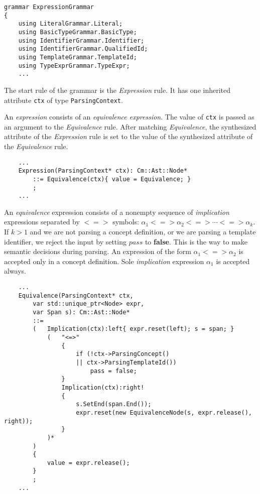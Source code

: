 \documentclass[a4paper,oneside,11pt]{book}
\theoremstyle{definition}
\begin{document}
\lstset{language=cmpg}
\begin{lstlisting}
grammar ExpressionGrammar
{
    using LiteralGrammar.Literal;
    using BasicTypeGrammar.BasicType;
    using IdentifierGrammar.Identifier;
    using IdentifierGrammar.QualifiedId;
    using TemplateGrammar.TemplateId;
    using TypeExprGrammar.TypeExpr;
    ...
\end{lstlisting}

The start rule of the grammar is the \emph{Expression} rule.
It has one inherited attribute \verb|ctx| of type \verb|ParsingContext|.

An \emph{expression} consists of an \emph{equivalence expression}.
The value of \verb|ctx| is passed as an argument to the \emph{Equivalence} rule.
After matching \emph{Equivalence}, the synthesized attribute of the \emph{Expression}
rule is set to the value of the synthesized attribute of the \emph{Equivalence} rule.

\lstset{language=cmpg}
\begin{lstlisting}
    ...
    Expression(ParsingContext* ctx): Cm::Ast::Node*
        ::= Equivalence(ctx){ value = Equivalence; }
        ;
    ...
\end{lstlisting}

An \emph{equivalence} expression consists of a nonempty sequence of \emph{implication}
expressions separated by $<=>$ symbols:
$\alpha_1 <=> \alpha_2 <=> \cdots <=> \alpha_k$.
If $k > 1$ and we are not parsing a concept definition, or we are parsing a template identifier,
we reject the input by setting $pass$ to \textbf{false}.
This is the way to make semantic decisions during parsing.
An expression of the form $\alpha_1 <=> \alpha_2$ is accepted only in a concept definition.
Sole \emph{implication} expression $\alpha_1$ is accepted always.

\lstset{language=cmpg}
\begin{lstlisting}
    ...
    Equivalence(ParsingContext* ctx,
        var std::unique_ptr<Node> expr,
        var Span s): Cm::Ast::Node*
        ::=
        (   Implication(ctx):left{ expr.reset(left); s = span; }
            (   "<=>"
                {
                    if (!ctx->ParsingConcept()
                    || ctx->ParsingTemplateId())
                        pass = false;
                }
                Implication(ctx):right!
                {
                    s.SetEnd(span.End());
                    expr.reset(new EquivalenceNode(s, expr.release(), right));
                }
            )*
        )
        {
            value = expr.release();
        }
        ;
    ...
\end{lstlisting}
\end{document}

